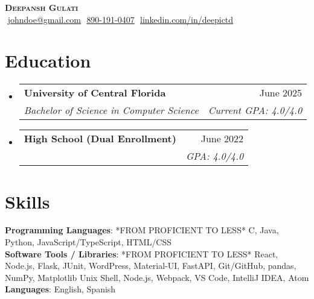 \documentclass[letterpaper,11pt]{article}
\makeatletter
\newcommand{\resumeSubheading}[4]{
  \vspace{-2pt}\item
    \begin{tabular*}{0.97\textwidth}[t]{l@{\extracolsep{\fill}}r}
      \textbf{#1} & #2 \\
      \textit{\small#3} & \textit{\small #4} \\
    \end{tabular*}\vspace{-7pt}
}
\newcommand{\resumeSubHeadingListStart}{\begin{itemize}[leftmargin=0.15in, label={}]}
\newcommand{\resumeSubHeadingListEnd}{\end{itemize}}
\makeatother
\begin{document}
\begin{flushright}
  \vspace{-4pt}
\end{flushright}

\vspace{-7pt}

\begin{center}
    \textbf{\Huge \scshape Deepansh Gulati} \\ \vspace{8pt}
    \small 
    \faEnvelope$  $
    \href{mailto:johndoe@gmail.com}
    {\underline{johndoe@gmail.com}}
    \faPhone$  $
    \underline{890-191-0407}
    \faLinkedin$  $
    \href{https://linkedin.com/in/deepictd}{\underline{linkedin.com/in/deepictd}} $  $
\end{center}

\section{Education}
  \resumeSubHeadingListStart
  
    \resumeSubheading
      {University of Central Florida}{June 2025}
      {Bachelor of Science in Computer Science}{Current GPA: 4.0/4.0}
      
    \resumeSubheading
      {High School \footnotesize{(Dual Enrollment)}}{June 2022}
      {}{GPA: 4.0/4.0}

  \resumeSubHeadingListEnd

\section{Skills}
 \begin{itemize}[leftmargin=0.15in, label={}]
    \small{\item{
    
     \textbf{Programming Languages}{: *FROM PROFICIENT TO LESS* C, Java, Python, JavaScript/TypeScript, HTML/CSS} \\
     
     \textbf{Software Tools / Libraries}{: *FROM PROFICIENT TO LESS* React, Node.js, Flask, JUnit, WordPress, Material-UI, FastAPI, Git/GitHub, pandas, NumPy, Matplotlib Unix Shell, Node.js, Webpack, VS Code, IntelliJ IDEA, Atom} \\

     \textbf{Languages}{: English, Spanish} \\
     
    }}
 \end{itemize}
\end{document}

